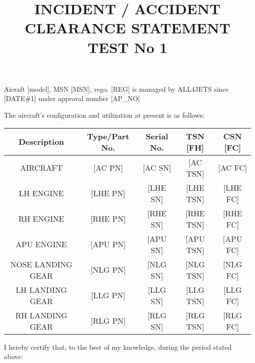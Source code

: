 \documentclass{article}
\title{INCIDENT / ACCIDENT CLEARANCE STATEMENT \\[1ex] TEST No 1}
\date{}
\author{}
\begin{document}
\maketitle

\justifying
Aicraft [model], MSN [MSN], rego. [REG] is managed by ALL4JETS since [DATE\#1] under approval number [AP\_NO]
\par
The aircraft's configuration and utilization at present is as follows:
\vspace{20pt}

\begin{center}
    \begin{tabular}{|c|c|c|c|c|}
        \hline
         \textbf{Description} & \textbf{Type/Part No.} & \textbf{Serial No.} & \textbf{TSN [FH]} & \textbf{CSN [FC]}\\
         \hline
         AIRCRAFT & [AC PN] & [AC SN] & [AC TSN] & [AC FC] \\
         \hline
         LH ENGINE & [LHE PN] & [LHE SN] & [LHE TSN] & [LHE FC] \\
         \hline
         RH ENGINE & [RHE PN] & [RHE SN] & [RHE TSN] & [RHE FC] \\
         \hline
         APU ENGINE & [APU PN] & [APU SN] & [APU TSN] & [APU FC] \\
         \hline
         NOSE LANDING GEAR & [NLG PN] & [NLG SN] & [NLG TSN] & [NLG FC] \\
         \hline
         LH LANDING GEAR & [LLG PN] & [LLG SN] & [LLG TSN] & [LLG FC] \\
         \hline
         RH LANDING GEAR & [RLG PN] & [RLG SN] & [RLG TSN] & [RLG FC] \\
         \hline
    \end{tabular}
\end{center}

\vspace{20pt}

 I hereby certify that, to the best of my knowledge, during the period stated above:

 \vspace{10pt}
\end{document}
